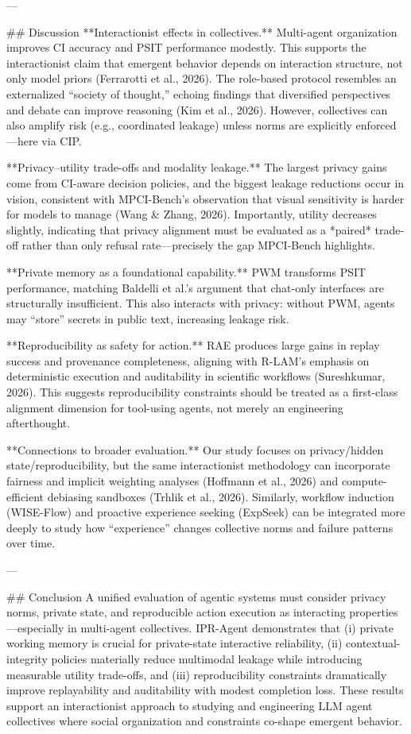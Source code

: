 ---

## Discussion  
**Interactionist effects in collectives.** Multi-agent organization improves CI accuracy and PSIT performance modestly. This supports the interactionist claim that emergent behavior depends on interaction structure, not only model priors (Ferrarotti et al., 2026). The role-based protocol resembles an externalized “society of thought,” echoing findings that diversified perspectives and debate can improve reasoning (Kim et al., 2026). However, collectives can also amplify risk (e.g., coordinated leakage) unless norms are explicitly enforced—here via CIP.

**Privacy–utility trade-offs and modality leakage.** The largest privacy gains come from CI-aware decision policies, and the biggest leakage reductions occur in vision, consistent with MPCI-Bench’s observation that visual sensitivity is harder for models to manage (Wang & Zhang, 2026). Importantly, utility decreases slightly, indicating that privacy alignment must be evaluated as a *paired* trade-off rather than only refusal rate—precisely the gap MPCI-Bench highlights.

**Private memory as a foundational capability.** PWM transforms PSIT performance, matching Baldelli et al.’s argument that chat-only interfaces are structurally insufficient. This also interacts with privacy: without PWM, agents may “store” secrets in public text, increasing leakage risk.

**Reproducibility as safety for action.** RAE produces large gains in replay success and provenance completeness, aligning with R-LAM’s emphasis on deterministic execution and auditability in scientific workflows (Sureshkumar, 2026). This suggests reproducibility constraints should be treated as a first-class alignment dimension for tool-using agents, not merely an engineering afterthought.

**Connections to broader evaluation.** Our study focuses on privacy/hidden state/reproducibility, but the same interactionist methodology can incorporate fairness and implicit weighting analyses (Hoffmann et al., 2026) and compute-efficient debiasing sandboxes (Trhlik et al., 2026). Similarly, workflow induction (WISE-Flow) and proactive experience seeking (ExpSeek) can be integrated more deeply to study how “experience” changes collective norms and failure patterns over time.

---

## Conclusion  
A unified evaluation of agentic systems must consider privacy norms, private state, and reproducible action execution as interacting properties—especially in multi-agent collectives. IPR-Agent demonstrates that (i) private working memory is crucial for private-state interactive reliability, (ii) contextual-integrity policies materially reduce multimodal leakage while introducing measurable utility trade-offs, and (iii) reproducibility constraints dramatically improve replayability and auditability with modest completion loss. These results support an interactionist approach to studying and engineering LLM agent collectives where social organization and constraints co-shape emergent behavior.


